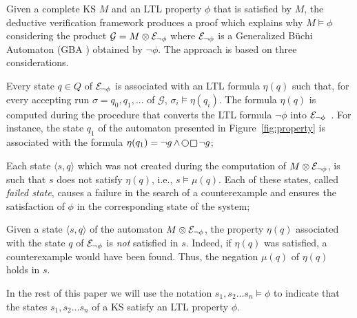 Given a complete KS $M$ and an LTL property $\phi$ that is satisfied by $M$, the deductive verification framework produces a proof which explains why $M \models \phi$~\cite{peled2001model} considering the product  
$\mathcal{G}=M \otimes \mathcal{E}_{\lnot\phi}$ where $\mathcal{E}_{\lnot\phi}$ is a  Generalized B{\"u}chi Automaton (GBA \cite{gerth1996ltl2ba}) obtained by $\lnot\phi$.
The approach is based on three considerations.
\begin{enumerate*}[label={(\arabic*)}]
\item Every state $q\in Q$ of $\mathcal{E}_{\lnot\phi}$ is associated with an LTL formula $\eta(q)$ such that, for every accepting run $\sigma=q_0,q_1,...$ of $\mathcal{G}$, $\sigma_i\models\eta(q_i)$. 
The formula $\eta(q)$  is computed during the procedure that converts the LTL formula $\neg \phi$ into $\mathcal{E}_{\lnot\phi}$~\cite{gerth1996ltl2ba}. For instance, the state $q_1$ of the automaton presented in Figure~\ref{fig:property} is associated with the formula $\eta(q_1)= \lnot g \LTLand \LTLnext \LTLglobally \lnot g$;
\item Each state $\langle s, q \rangle$  which was not created during the computation of $M\otimes \mathcal{E}_{\lnot\phi}$, is such that $s$ does not satisfy $\eta(q)$, i.e., $s \models \mu(q)$.
Each of these states, called \emph{failed state}, causes a failure in the search of a counterexample and ensures the satisfaction of $\phi$ in the corresponding state of the system;
\item Given a state $\langle s, q \rangle$ of the automaton $M\otimes \mathcal{E}_{\lnot\phi}$, the property $\eta(q)$ associated with the state $q$ of $\mathcal{E}_{\lnot\phi}$ is \emph{not} satisfied in $s$. 
Indeed, if $\eta(q)$ was satisfied, a counterexample would have been found.
Thus, the negation $\mu(q)$ of $\eta(q)$ holds in $s$.
\end{enumerate*} 

In the rest of this paper we will use the notation $s_1, s_2 \ldots s_n \models  \phi$ to indicate that the states $s_1, s_2 \ldots s_n$ of a KS satisfy an LTL property $\phi$.

